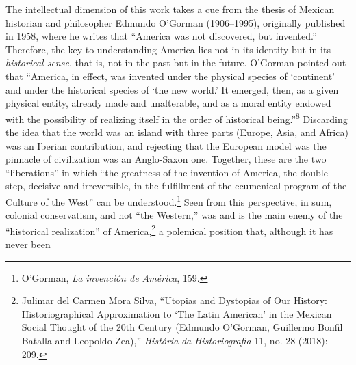 \documentclass{tufte-handout}
\begin{document}
The intellectual dimension of this work takes a cue from the thesis of
Mexican historian and philosopher Edmundo O'Gorman (1906--1995),
originally published in 1958, where he writes that ``America was not
discovered, but invented.'' Therefore, the key to understanding America
lies not in its identity but in its \emph{historical sense}, that is,
not in the past but in the future. O'Gorman pointed out that ``America,
in effect, was invented under the physical species of `continent' and
under the historical species of `the new world.' It emerged, then, as a
given physical entity, already made and unalterable, and as a moral
entity endowed with the possibility of realizing itself in the order of
historical being.''\textsuperscript{8} Discarding the idea that the world was
an island with three parts (Europe, Asia, and Africa) was an Iberian
contribution, and rejecting that the European model was the pinnacle of
civilization was an Anglo-Saxon one. Together, these are the two
``liberations'' in which ``the greatness of the invention of America,
the double step, decisive and irreversible, in the fulfillment of the
ecumenical program of the Culture of the West'' can be
understood.\footnote{O'Gorman, \emph{La invención de América}, 159.}
Seen from this perspective, in sum, colonial conservatism, and not ``the
Western,'' was and is the main enemy of the ``historical realization''
of America,\footnote{Julimar del Carmen Mora Silva, ``Utopias and
  Dystopias of Our History: Historiographical Approximation to `The
  Latin American' in the Mexican Social Thought of the 20th Century
  (Edmundo O'Gorman, Guillermo Bonfil Batalla and Leopoldo Zea),''
  \emph{História} \emph{da} \emph{Historiografia} 11, no. 28 (2018):
  209.} a polemical position that, although it has never been
\end{document}
